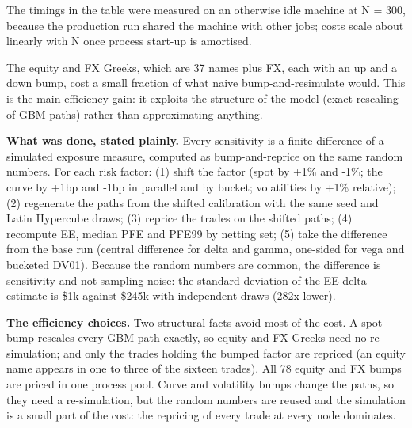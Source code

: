 \documentclass[11pt,letterpaper]{article}
\begin{document}
The timings in the table were measured on an otherwise idle machine at N = 300, because the production run shared the machine with other jobs; costs scale about linearly with N once process start-up is amortised.

The equity and FX Greeks, which are 37 names plus FX, each with an up and a down bump, cost a small fraction of what naive bump-and-resimulate would. This is the main efficiency gain: it exploits the structure of the model (exact rescaling of GBM paths) rather than approximating anything.

\textbf{What was done, stated plainly.} Every sensitivity is a finite difference of a simulated exposure measure, computed as bump-and-reprice on the same random numbers. For each risk factor: (1) shift the factor (spot by +1\% and -1\%; the curve by +1bp and -1bp in parallel and by bucket; volatilities by +1\% relative); (2) regenerate the paths from the shifted calibration with the same seed and Latin Hypercube draws; (3) reprice the trades on the shifted paths; (4) recompute EE, median PFE and PFE99 by netting set; (5) take the difference from the base run (central difference for delta and gamma, one-sided for vega and bucketed DV01). Because the random numbers are common, the difference is sensitivity and not sampling noise: the standard deviation of the EE delta estimate is \$1k against \$245k with independent draws (282x lower).

\textbf{The efficiency choices.} Two structural facts avoid most of the cost. A spot bump rescales every GBM path exactly, so equity and FX Greeks need no re-simulation; and only the trades holding the bumped factor are repriced (an equity name appears in one to three of the sixteen trades). All 78 equity and FX bumps are priced in one process pool. Curve and volatility bumps change the paths, so they need a re-simulation, but the random numbers are reused and the simulation is a small part of the cost: the repricing of every trade at every node dominates.
\end{document}
